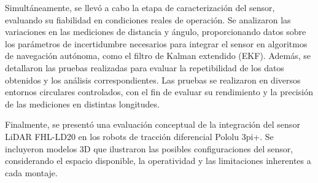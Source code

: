 Simultáneamente, se llevó a cabo la etapa de caracterización del sensor, evaluando su fiabilidad en condiciones reales de operación. Se analizaron las variaciones en las mediciones de distancia y ángulo, proporcionando datos sobre los parámetros de incertidumbre necesarios para integrar el sensor en algoritmos de navegación autónoma, como el filtro de Kalman extendido (EKF). Además, se detallaron las pruebas realizadas para evaluar la repetibilidad de los datos obtenidos y los análisis correspondientes. Las pruebas se realizaron en diversos entornos circulares controlados, con el fin de evaluar su rendimiento y la precisión de las mediciones en distintas longitudes.

Finalmente, se presentó una evaluación conceptual de la integración del sensor LiDAR FHL-LD20 en los robots de tracción diferencial Pololu 3pi+. Se incluyeron modelos 3D que ilustraron las posibles configuraciones del sensor, considerando el espacio disponible, la operatividad y las limitaciones inherentes a cada montaje. 